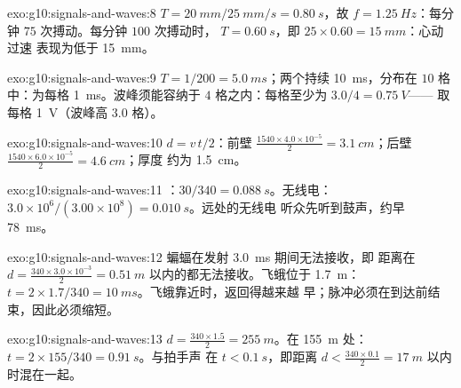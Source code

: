 \begin{solution}{exo:g10:signals-and-waves:8}
$T = \qty{20}{mm}/\qty{25}{mm/s} = \qty{0.80}{s}$，故
$f = \qty{1.25}{Hz}$：每分钟 $75$ 次搏动。每分钟 $100$ 次搏动时，
$T = \qty{0.60}{s}$，即 $25 \times 0.60 = \qty{15}{mm}$：心动过速
表现为低于 \qty{15}{mm}。
\end{solution}

\begin{solution}{exo:g10:signals-and-waves:9}
$T = 1/200 = \qty{5.0}{ms}$；两个持续 \qty{10}{ms}，分布在
$10$ 格中：为每格 \qty{1}{ms}。波峰须能容纳于
$4$ 格之内：每格至少为 $3.0/4 = \qty{0.75}{V}$——
取每格 \qty{1}{V}（波峰高 $3.0$ 格）。
\end{solution}

\begin{solution}{exo:g10:signals-and-waves:10}
$d = v\,t/2$：前壁
$\frac{1540 \times 4.0\times10^{-5}}{2} = \qty{3.1}{cm}$；后壁
$\frac{1540 \times 6.0\times10^{-5}}{2} = \qty{4.6}{cm}$；厚度
约为 \qty{1.5}{cm}。
\end{solution}

\begin{solution}{exo:g10:signals-and-waves:11}
：$30/340 = \qty{0.088}{s}$。无线电：
$3.0\times10^{6}/(3.00\times10^{8}) = \qty{0.010}{s}$。远处的无线电
听众先听到鼓声，约早 \qty{78}{ms}。
\end{solution}

\begin{solution}{exo:g10:signals-and-waves:12}
蝙蝠在发射 \qty{3.0}{ms} 期间无法接收，即
距离在 $d = \frac{340 \times 3.0\times10^{-3}}{2} =
\qty{0.51}{m}$ 以内的都无法接收。飞蛾位于 \qty{1.7}{m}：
$t = 2 \times 1.7/340 = \qty{10}{ms}$。飞蛾靠近时，返回得越来越
早；脉冲必须在到达前结束，因此必须缩短。
\end{solution}

\begin{solution}{exo:g10:signals-and-waves:13}
$d = \frac{340 \times 1.5}{2} = \qty{255}{m}$。在 \qty{155}{m} 处：
$t = 2 \times 155/340 = \qty{0.91}{s}$。与拍手声
在 $t < \qty{0.1}{s}$，即距离
$d < \frac{340 \times 0.1}{2} = \qty{17}{m}$ 以内时混在一起。
\end{solution}

